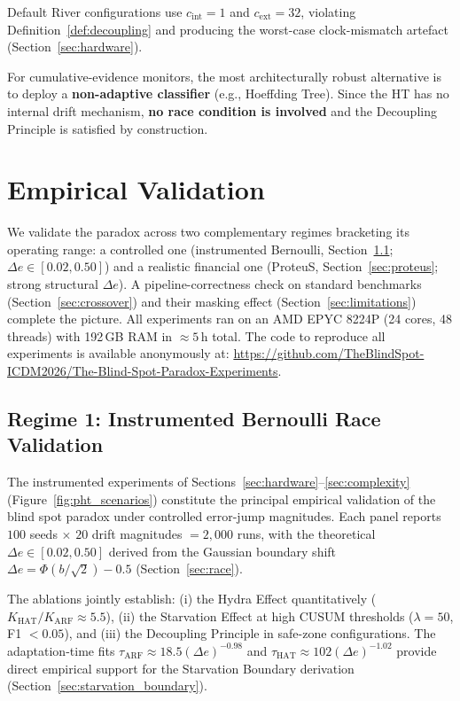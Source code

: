 \documentclass[10pt,conference]{IEEEtran}
\theoremstyle{definition}
\begin{document}
Default River configurations use $c_{\mathrm{int}} = 1$ and $c_{\mathrm{ext}} = 32$, violating Definition~\ref{def:decoupling} and producing the worst-case clock-mismatch artefact (Section~\ref{sec:hardware}).

For cumulative-evidence monitors, the most architecturally robust alternative is to deploy a \textbf{non-adaptive classifier} (e.g., Hoeffding Tree). Since the HT has no internal drift mechanism, \textbf{no race condition is involved} and the Decoupling Principle is satisfied by construction.

\section{Empirical Validation}\label{sec:experiments}

We validate the paradox across two complementary regimes bracketing its operating range: a controlled one (instrumented Bernoulli, Section~\ref{sec:bernoulli_validation}; $\Delta e \in [0.02, 0.50]$) and a realistic financial one (ProteuS, Section~\ref{sec:proteus}; strong structural $\Delta e$). A pipeline-correctness check on standard benchmarks (Section~\ref{sec:crossover}) and their masking effect (Section~\ref{sec:limitations}) complete the picture. All experiments ran on an AMD EPYC 8224P (24 cores, 48 threads) with 192\,GB RAM in ${\approx}5$\,h total. The code to reproduce all experiments is available anonymously at: \url{https://github.com/TheBlindSpot-ICDM2026/The-Blind-Spot-Paradox-Experiments}.

\subsection{Regime 1: Instrumented Bernoulli Race Validation}\label{sec:bernoulli_validation}

The instrumented experiments of Sections~\ref{sec:hardware}--\ref{sec:complexity} (Figure~\ref{fig:pht_scenarios}) constitute the principal empirical validation of the blind spot paradox under controlled error-jump magnitudes. Each panel reports $100$ seeds $\times$ $20$ drift magnitudes $= 2{,}000$ runs, with the theoretical $\Delta e \in [0.02, 0.50]$ derived from the Gaussian boundary shift $\Delta e = \Phi(b/\sqrt{2}) - 0.5$ (Section~\ref{sec:race}).

The ablations jointly establish: (i) the Hydra Effect quantitatively ($K_{\mathrm{HAT}}/K_{\mathrm{ARF}} \approx 5.5$), (ii) the Starvation Effect at high CUSUM thresholds ($\lambda = 50$, F1 $< 0.05$), and (iii) the Decoupling Principle in safe-zone configurations. The adaptation-time fits $\tau_{\mathrm{ARF}} \approx 18.5(\Delta e)^{-0.98}$ and $\tau_{\mathrm{HAT}} \approx 102(\Delta e)^{-1.02}$ provide direct empirical support for the Starvation Boundary derivation (Section~\ref{sec:starvation_boundary}).
\end{document}
